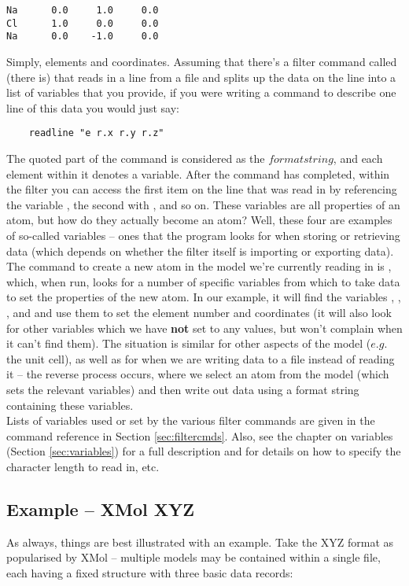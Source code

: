 \begin{verbatim}
Na      0.0     1.0     0.0
Cl      1.0     0.0     0.0
Na      0.0    -1.0     0.0
\end{verbatim}

Simply, elements and coordinates. Assuming that there's a filter command called  (there is) that reads in a line from a file and splits up the data on the line into a list of variables that you provide, if you were writing a command to describe one line of this data you would just say:

\begin{verbatim}
	readline "e r.x r.y r.z"
\end{verbatim}

The quoted part of the command is considered as the $format string$, and each element within it denotes a variable. After the command has completed, within the filter you can access the first item on the line that was read in by referencing the variable , the second with , and so on. These variables are all properties of an atom, but how do they actually become an atom? Well, these four are examples of so-called  variables -- ones that the program looks for when storing or retrieving data (which depends on whether the filter itself is importing or exporting data). The command to create a new atom in the model we're currently reading in is , which, when run, looks for a number of specific variables from which to take data to set the properties of the new atom. In our example, it will find the variables , , , and  and use them to set the element number and coordinates (it will also look for other variables which we have \textbf{not} set to any values, but won't complain when it can't find them). The situation is similar for other aspects of the model ($e.g.$ the unit cell), as well as for when we are writing data to a file instead of reading it -- the reverse process occurs, where we select an atom from the model (which sets the relevant variables) and then write out data using a format string containing these variables. \\

Lists of variables used or set by the various filter commands are given in the command reference in Section \ref{sec:filtercmds}. Also, see the chapter on variables (Section \ref{sec:variables}) for a full description and for details on how to specify the character length to read in, etc.


\subsection{Example -- XMol XYZ}
\label{sec:filterex1}
As always, things are best illustrated with an example. Take the XYZ format as popularised by XMol -- multiple models may be contained within a single file, each having a fixed structure with three basic data records:


